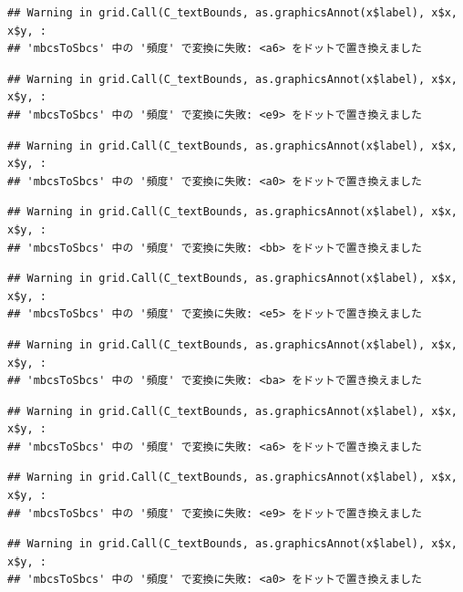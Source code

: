 \documentclass[
]{book}
\begin{document}
\begin{verbatim}
## Warning in grid.Call(C_textBounds, as.graphicsAnnot(x$label), x$x, x$y, :
## 'mbcsToSbcs' 中の '頻度' で変換に失敗: <a6> をドットで置き換えました
\end{verbatim}

\begin{verbatim}
## Warning in grid.Call(C_textBounds, as.graphicsAnnot(x$label), x$x, x$y, :
## 'mbcsToSbcs' 中の '頻度' で変換に失敗: <e9> をドットで置き換えました
\end{verbatim}

\begin{verbatim}
## Warning in grid.Call(C_textBounds, as.graphicsAnnot(x$label), x$x, x$y, :
## 'mbcsToSbcs' 中の '頻度' で変換に失敗: <a0> をドットで置き換えました
\end{verbatim}

\begin{verbatim}
## Warning in grid.Call(C_textBounds, as.graphicsAnnot(x$label), x$x, x$y, :
## 'mbcsToSbcs' 中の '頻度' で変換に失敗: <bb> をドットで置き換えました
\end{verbatim}

\begin{verbatim}
## Warning in grid.Call(C_textBounds, as.graphicsAnnot(x$label), x$x, x$y, :
## 'mbcsToSbcs' 中の '頻度' で変換に失敗: <e5> をドットで置き換えました
\end{verbatim}

\begin{verbatim}
## Warning in grid.Call(C_textBounds, as.graphicsAnnot(x$label), x$x, x$y, :
## 'mbcsToSbcs' 中の '頻度' で変換に失敗: <ba> をドットで置き換えました
\end{verbatim}

\begin{verbatim}
## Warning in grid.Call(C_textBounds, as.graphicsAnnot(x$label), x$x, x$y, :
## 'mbcsToSbcs' 中の '頻度' で変換に失敗: <a6> をドットで置き換えました
\end{verbatim}

\begin{verbatim}
## Warning in grid.Call(C_textBounds, as.graphicsAnnot(x$label), x$x, x$y, :
## 'mbcsToSbcs' 中の '頻度' で変換に失敗: <e9> をドットで置き換えました
\end{verbatim}

\begin{verbatim}
## Warning in grid.Call(C_textBounds, as.graphicsAnnot(x$label), x$x, x$y, :
## 'mbcsToSbcs' 中の '頻度' で変換に失敗: <a0> をドットで置き換えました
\end{verbatim}
\end{document}
